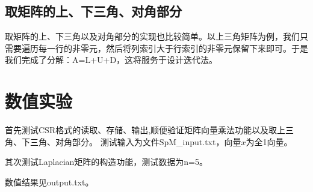 \documentclass[11pt,a4 paper,one side]{article}
\begin{document}
\subsection{取矩阵的上、下三角、对角部分}
取矩阵的上、下三角以及对角部分的实现也比较简单。以上三角矩阵为例，我们只需要遍历每一行的非零元，然后将列索引大于行索引的非零元保留下来即可。于是我们完成了分解：A=L+U+D，这将服务于设计迭代法。
\section{数值实验}
首先测试CSR格式的读取、存储、输出,顺便验证矩阵向量乘法功能以及取上三角、下三角、对角部分。
测试输入为文件SpM\_input.txt，向量$x$为全1向量。
\par 其次测试Laplacian矩阵的构造功能，测试数据为n=5。
\par 数值结果见output.txt。
\end{document}
